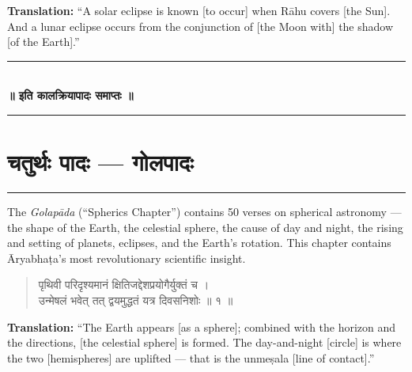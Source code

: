 \documentclass[11pt,a4paper]{article}
\newcommand{\dev}[1]{{\devanagarifont #1}}
\newenvironment{sanskritverse}{\begin{verse}\devanagarifont\large\centering}{\end{verse}}
\begin{document}
\vspace{0.3cm}
\noindent\textbf{Translation:} ``A solar eclipse is known [to occur] when Rāhu covers [the Sun]. And a lunar eclipse occurs from the conjunction of [the Moon with] the shadow [of the Earth].''

\vspace{0.5cm}

\begin{center}
\textcolor{rulecolor}{\rule{0.6\textwidth}{0.4pt}}\\[0.5em]
\textbf{\dev{॥ इति कालक्रियापादः समाप्तः ॥}}\\[0.3em]
\textcolor{rulecolor}{\rule{0.6\textwidth}{0.4pt}}
\end{center}

\clearpage

\section*{\dev{चतुर्थः पादः — गोलपादः}}

\begin{center}
\textcolor{rulecolor}{\rule{0.8\textwidth}{0.6pt}}
\end{center}

\noindent
The \textit{Golapāda} (``Spherics Chapter'') contains 50 verses on spherical astronomy --- the shape of the Earth, the celestial sphere, the cause of day and night, the rising and setting of planets, eclipses, and the Earth's rotation. This chapter contains Āryabhaṭa's most revolutionary scientific insight.

\vspace{0.3cm}

\begin{tcolorbox}[colback=white,colframe=rulecolor,title={\dev{\textbf{गोल १ — गोलविनिर्माणम् (The Celestial Sphere)}}}]
\begin{sanskritverse}
\dev{पृथिवी परिदृश्यमानं क्षितिजद्देशप्रयोगैर्युक्तं च ।\\
उन्मेषलं भवेत् तत् द्वयमुद्धतं यत्र दिवसनिशोः ॥ १ ॥}
\end{sanskritverse}
\end{tcolorbox}

\vspace{0.3cm}
\noindent\textbf{Translation:} ``The Earth appears [as a sphere]; combined with the horizon and the directions, [the celestial sphere] is formed. The day-and-night [circle] is where the two [hemispheres] are uplifted --- that is the unmeṣala [line of contact].''
\end{document}
